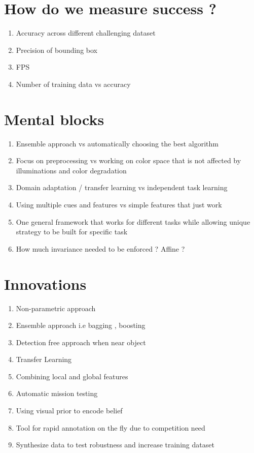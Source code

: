 \section{How do we measure success ?}

\begin{enumerate}
    \item Accuracy across different challenging dataset
    \item Precision of bounding box
    \item FPS
    \item Number of training data vs accuracy 
\end{enumerate}

\section{Mental blocks}

\begin{enumerate}
    \item Ensemble approach vs automatically choosing the best algorithm
    \item Focus on preprocessing vs working on color space that is not affected by illuminations and color degradation
    \item Domain adaptation / transfer learning vs independent task learning
    \item Using multiple cues and features vs simple features that just work
    \item One general framework that works for different tasks while allowing unique strategy to be built for specific task
    \item How much invariance needed to be enforced ? Affine ?
\end{enumerate}

\section{Innovations}

\begin{enumerate}
    \item Non-parametric approach
    \item Ensemble approach i.e bagging , boosting
    \item Detection free approach when near object
    \item Transfer Learning
    \item Combining local and global features
    \item Automatic mission testing 
    \item Using visual prior to encode belief
    \item Tool for rapid annotation on the fly due to competition need
    \item Synthesize data to test robustness and increase training dataset
    
    
\end{enumerate}

